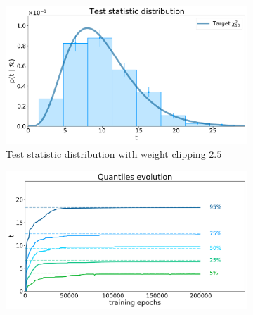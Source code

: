 \begin{figure}[h]
    \begin{subfigure}[b]{0.5\textwidth}
        \centering 
        \includegraphics[width=1.0\textwidth]{../PLOTS/DRIFT_TIME/thesis/t_reference.pdf}
        \caption{Test statistic distribution with weight clipping $2.5$}
        \label{fig:dt_ref:c}
    \end{subfigure}%
    \begin{subfigure}[b]{0.5\textwidth}
        \centering 
        \includegraphics[width=1.0\textwidth]{../PLOTS/DRIFT_TIME/thesis/reference_quantiles.pdf}

\end{subfigure}
\end{figure}
